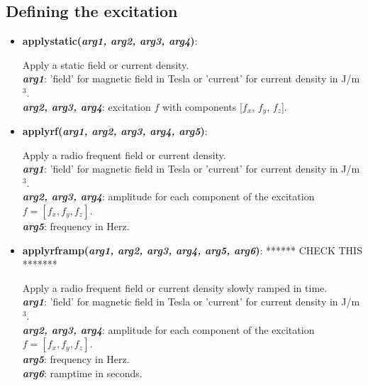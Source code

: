 \subsection{Defining the excitation}

\begin{itemize}

 \item {\textbf{applystatic(\textit{arg1, arg2, arg3, arg4})}:
				\flushright\parbox{0.9 \textwidth}{\vspace{-0.25cm} 
				Apply a static field or current density.\\
				\textbf{\textit{arg1}}: 'field' for magnetic field in Tesla or 'current' for current density in J/m$^3$.\\
				\textbf{\textit{arg2, arg3, arg4}}: excitation $f$ with components [$f_x$, $f_y$, $f_z$].
				}\flushleft}

 \item {\vspace{-0.4cm}\textbf{applyrf(\textit{arg1, arg2, arg3, arg4, arg5})}:
				\flushright\parbox{0.9 \textwidth}{\vspace{-0.25cm} 
				Apply a radio frequent field or current density.\\
				\textbf{\textit{arg1}}: 'field' for magnetic field in Tesla or 'current' for current density in J/m$^3$.\\
				\textbf{\textit{arg2, arg3, arg4}}: amplitude for each component of the excitation $f = [f_x, f_y, f_z]$.\\
				\textbf{\textit{arg5}}: frequency in Herz.
				}\flushleft}

 \item {\vspace{-0.4cm}\textbf{applyrframp(\textit{arg1, arg2, arg3, arg4, arg5, arg6})}:   ****** CHECK THIS *******
				\flushright\parbox{0.9 \textwidth}{\vspace{-0.25cm} 
				Apply a radio frequent field or current density slowly ramped in time.\\
				\textbf{\textit{arg1}}: 'field' for magnetic field in Tesla or 'current' for current density in J/m$^3$.\\
				\textbf{\textit{arg2, arg3, arg4}}: amplitude for each component of the excitation $f = [f_x, f_y, f_z]$.\\
				\textbf{\textit{arg5}}: frequency in Herz.\\
				\textbf{\textit{arg6}}: ramptime in seconds.
				}\flushleft}


\end{itemize}
